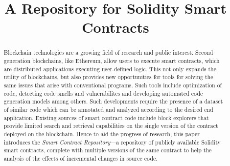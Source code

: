 \documentclass[10pt,conference]{IEEEtran}
\begin{document}
	
	\title{A Repository for Solidity Smart Contracts\\}
	
	
	\maketitle
	
	\begin{abstract}
		Blockchain technologies are a growing field of research and public interest. Second generation blockchains, like Ethereum, allow users to execute smart contracts, which are distributed applications executing user-defined logic. This not only expands the utility of blockchains, but also provides new opportunities for tools for solving the same issues that arise with conventional programs. Such tools include optimization of code, detecting code smells and vulnerabilites and developing automated code generation models among others. Such developments require the presence of a dataset of similar code which can be annotated and analyzed according to the desired end application. Existing sources of smart contract code include block explorers that provide limited search and retrieval capabilities on the single version of the contract deployed on the blockchain. Hence to aid the progress of research, this paper introduces the \textit{Smart Contract Repository}---a repository of publicly available Solidity smart contracts, complete with multiple versions of the same contract to help the analysis of the effects of incremental changes in source code.
	\end{abstract}
	
\end{document}
